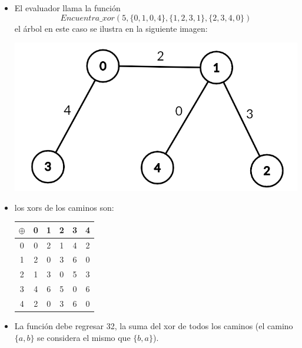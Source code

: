 \documentclass[12pt]{scrartcl}
\begin{document}
        \begin{itemize}
            \item  El evaluador llama la función 
            $$Encuentra\_xor(5, \{0, 1, 0, 4\}, \{1, 2, 3, 1\}, \{2, 3, 4, 0\})$$ 
            el árbol en este caso se ilustra en la siguiente imagen:
            
            \begin{center}
                \includegraphics[scale=0.3]{ej1.png}
            \end{center}
            
            \item los xors de los caminos son:

                \begin{center}
                    
                \begin{tabular}{|c||c|c|c|c|c|}
                     \hline
                      $\oplus$ & 0 & 1 & 2 & 3 & 4  \\
                     \hline
                     \hline 
                     0 & 0 & 2 & 1 & 4 & 2 \\
                     \hline 
                     1 & 2 & 0 & 3 & 6 & 0 \\ 
                     \hline
                     2 & 1 & 3 & 0 & 5 & 3 \\
                     \hline
                     3 & 4 & 6 & 5 & 0 & 6 \\
                     \hline
                     4 & 2 & 0 & 3 & 6 & 0 \\
                     \hline
                \end{tabular}
                
                \end{center}
            \item  La función debe regresar 32, la suma del xor de todos los caminos (el camino $\{a, b\}$ se considera el mismo que $\{b, a\}$).
                
        \end{itemize}
\end{document}
